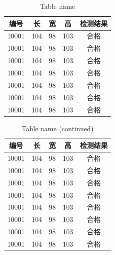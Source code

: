 \documentclass[
	StudentName     = 孙敬垚,
	StudentNameEng	= {{Name of Graduate (such as HAN Bao-cheng)}},
	AdvisorName     = {{冯兴杰 教授}},
	AdvisorNameEng	= {{Name of Supervisor and Title (such as Prof. FENG Chang-gen)}},
        AdvisorNameEngSecond = {{Name of Second Supervisor and Title}},
	StudentID		= XXXXX,
	Major           = ,
	ResearchInterest= ,
	Department		= XXXX学院,
	DepartmentEng	= {{Name of Department (or School)}},
	SubmitYear		= 202X,
	SubmitMonth		= X,
	SubmitDay		= XX,
	DefenseYear		= 202X,
	DefenseMonth	= X,
	DefenseDay		= XX,
	DefenseDateEng	= {{Date of Submit (such as April 2002)}},
	Title           = I2TDM,
	TitleEng        = {{English Title}},
	CLCNumber		= TD235,
	UDCNumber		= 624.152.5
]{cauc_thesis}
\begin{document}
\begin{table}[!ht]
	\setlength{\abovecaptionskip}{0cm}
	\tabcolsep=1cm
	\renewcommand\arraystretch{1.2}
	\renewcommand{\tablename}{表}
	\caption{表名}
	\addtocounter{table}{-1}
	\renewcommand{\tablename}{Tab.}
	\caption{Table name}
	\label{tab:lable}
	\begin{center}
		\begin{tabular}{ccccc}
			\toprule[1.5pt]
			编号	&长	&宽	&高	&检测结果\\
			\midrule[1.5pt]
			10001	&104	&98	&103	&合格\\
			10001	&104	&98	&103	&合格\\
			10001	&104	&98	&103	&合格\\
			10001	&104	&98	&103	&合格\\
			10001	&104	&98	&103	&合格\\
			10001	&104	&98	&103	&合格\\
			10001	&104	&98	&103	&合格\\
			\bottomrule[1.5pt]
		\end{tabular}
	\end{center}
\end{table}

\begin{table}[!h]
	\addtocounter{table}{-1}
	\setlength{\abovecaptionskip}{0cm}
	\tabcolsep=1cm
	\renewcommand\arraystretch{1.2}
	\renewcommand{\tablename}{表}
	\caption{表名（续）}
	\addtocounter{table}{-1}
	\renewcommand{\tablename}{Tab.}
	\caption{Table name (continued)}
	\label{tab:lable}
	\begin{center}
		\begin{tabular}{ccccc}
			\toprule[1.5pt]
			编号	&长	&宽	&高	&检测结果\\
			\midrule[1.5pt]
			10001	&104	&98	&103	&合格\\
			10001	&104	&98	&103	&合格\\
			10001	&104	&98	&103	&合格\\
			10001	&104	&98	&103	&合格\\
			10001	&104	&98	&103	&合格\\
			10001	&104	&98	&103	&合格\\
			10001	&104	&98	&103	&合格\\
			10001	&104	&98	&103	&合格\\
			\bottomrule[1.5pt]
		\end{tabular}
	\end{center}
\end{table}
\vspace{-16pt}
\end{document}
